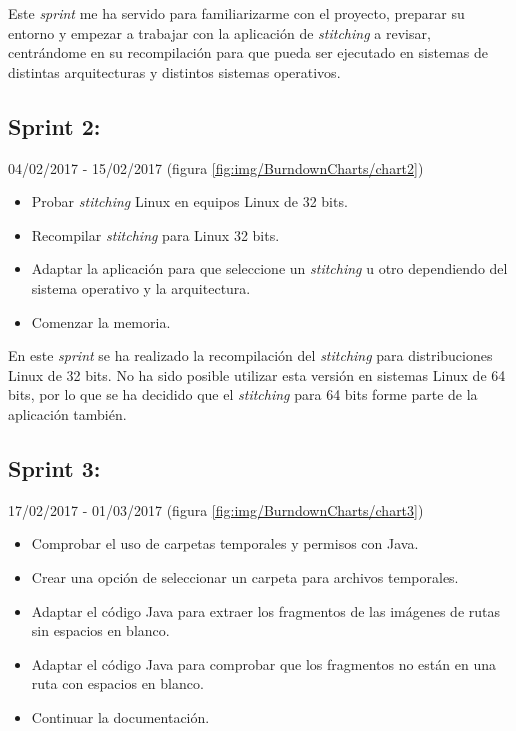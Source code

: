 Este \textit{sprint} me ha servido para familiarizarme con el proyecto, preparar su entorno y empezar a trabajar con la aplicación de \textit{stitching} a revisar, centrándome en su recompilación para que pueda ser ejecutado en sistemas de distintas arquitecturas y distintos sistemas operativos. 

\newpage

\subsection{Sprint 2:}
04/02/2017 - 15/02/2017 (figura \ref{fig:img/BurndownCharts/chart2})


\begin{itemize}
    \item Probar \textit{stitching} Linux en equipos Linux de 32 bits.
    \item Recompilar \textit{stitching} para Linux 32 bits.
    \item Adaptar la aplicación para que seleccione un \textit{stitching} u otro dependiendo del sistema operativo y la arquitectura.
    \item Comenzar la memoria.
\end{itemize}

En este \textit{sprint} se ha realizado la recompilación del \textit{stitching} para distribuciones Linux de 32 bits. No ha sido posible utilizar esta versión en sistemas Linux de 64 bits, por lo que se ha decidido que el \textit{stitching} para 64 bits forme parte de la aplicación también. 

\newpage

\subsection{Sprint 3:} 
17/02/2017 - 01/03/2017 (figura \ref{fig:img/BurndownCharts/chart3})


\begin{itemize}
    \item Comprobar el uso de carpetas temporales y permisos con Java.
    \item Crear una opción de seleccionar un carpeta para archivos temporales.
    \item Adaptar el código Java para extraer los fragmentos de las imágenes de rutas sin espacios en blanco.
    \item Adaptar el código Java para comprobar que los fragmentos no están en una ruta con espacios en blanco.
    \item Continuar la documentación.
\end{itemize}


